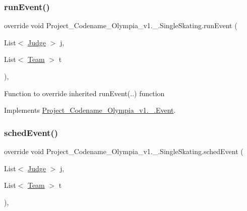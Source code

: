 \mbox{\label{classProject__Codename__Olympia__v1_1_1__0_1_1SingleSkating_abf63b846664f64fe96a68a05787f79aa}} 
\subsubsection{\texorpdfstring{run\+Event()}{runEvent()}}
{\footnotesize\ttfamily override void Project\+\_\+\+Codename\+\_\+\+Olympia\+\_\+v1.\+\_.\+Single\+Skating.\+run\+Event (\begin{DoxyParamCaption}\item[{List$<$ \hyperlink{classProject__Codename__Olympia__v1_1_1__0_1_1Judge}{Judge} $>$}]{j,  }\item[{List$<$ \hyperlink{classProject__Codename__Olympia__v1_1_1__0_1_1Team}{Team} $>$}]{t }\end{DoxyParamCaption})\hspace{0.3cm}{\ttfamily [inline]}, {\ttfamily [virtual]}}

Function to override inherited run\+Event(..) function 

Implements \hyperlink{classProject__Codename__Olympia__v1_1_1__0_1_1Event_ac6ff060da23153c02da49937dcf9f326}{Project\+\_\+\+Codename\+\_\+\+Olympia\+\_\+v1.\+\_.\+Event}.

\mbox{\label{classProject__Codename__Olympia__v1_1_1__0_1_1SingleSkating_a481a432870964cfce7c319572c794a55}} 
\subsubsection{\texorpdfstring{sched\+Event()}{schedEvent()}}
{\footnotesize\ttfamily override void Project\+\_\+\+Codename\+\_\+\+Olympia\+\_\+v1.\+\_.\+Single\+Skating.\+sched\+Event (\begin{DoxyParamCaption}\item[{List$<$ \hyperlink{classProject__Codename__Olympia__v1_1_1__0_1_1Judge}{Judge} $>$}]{j,  }\item[{List$<$ \hyperlink{classProject__Codename__Olympia__v1_1_1__0_1_1Team}{Team} $>$}]{t }\end{DoxyParamCaption})\hspace{0.3cm}{\ttfamily [inline]}, {\ttfamily [virtual]}}

